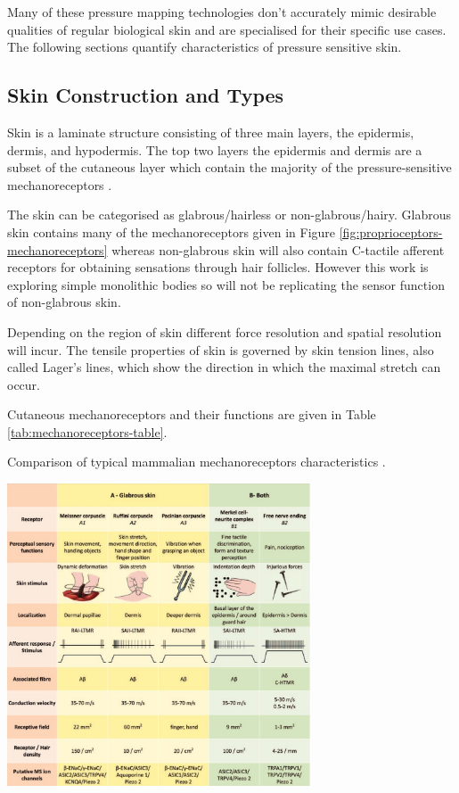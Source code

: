 Many of these pressure mapping technologies don't accurately mimic desirable qualities of regular biological skin and are specialised for their specific use cases. The following sections quantify characteristics of pressure sensitive skin.

\subsection{Skin Construction and Types}
Skin is a laminate structure consisting of three main layers, the epidermis, dermis, and hypodermis. The top two layers the epidermis and dermis are a subset of the cutaneous layer which contain the majority of the pressure-sensitive mechanoreceptors \cite{}.

The skin can be categorised as glabrous/hairless or non-glabrous/hairy. Glabrous skin contains many of the mechanoreceptors given in Figure \ref{fig:proprioceptors-mechanoreceptors} whereas non-glabrous skin will also contain C-tactile afferent receptors for obtaining sensations through hair follicles. However this work is exploring simple monolithic bodies so will not be replicating the sensor function of non-glabrous skin.

Depending on the region of skin different force resolution and spatial resolution will incur. The tensile properties of skin is governed by skin tension lines, also called Lager's lines, which show the direction in which the maximal stretch can occur. 

Cutaneous mechanoreceptors and their functions are given in Table \ref{tab:mechanoreceptors-table}.
\begin{table}[H]
    \centering
    \caption{Comparison of typical mammalian mechanoreceptors characteristics \cite{Roudaut2012}.}
    \label{tab:mechanoreceptors-table}
    \includegraphics[width=9cm]{Figures/mechanoreceptors-table-cropped.jpg}
\end{table}


